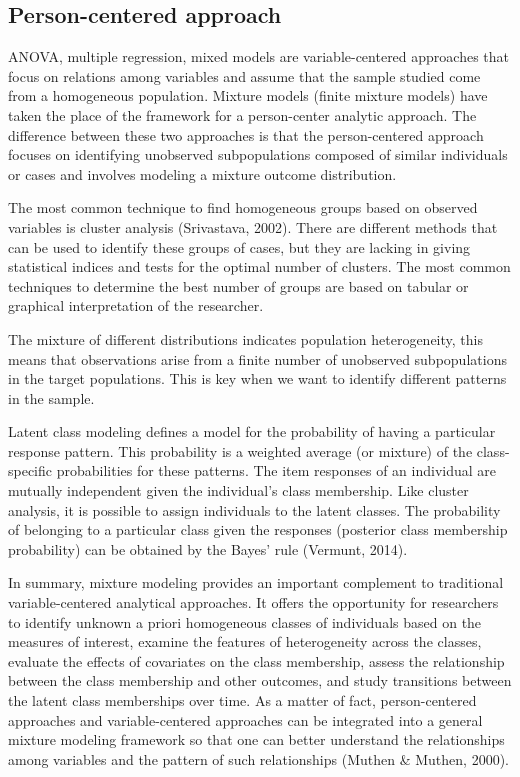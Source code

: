 \documentclass[12pt,a4paper,oneside]{reedthesis}
\begin{document}
\hypertarget{person-centered-approach}{%
\subsection{Person-centered approach}\label{person-centered-approach}}

ANOVA, multiple regression, mixed models are variable-centered approaches that focus on relations among variables and assume that the sample studied come from a homogeneous population. Mixture models (finite mixture models) have taken the place of the framework for a person-center analytic approach. The difference between these two approaches is that the person-centered approach focuses on identifying unobserved subpopulations composed of similar individuals or cases and involves modeling a mixture outcome distribution.

The most common technique to find homogeneous groups based on observed variables is cluster analysis (Srivastava, 2002). There are different methods that can be used to identify these groups of cases, but they are lacking in giving statistical indices and tests for the optimal number of clusters. The most common techniques to determine the best number of groups are based on tabular or graphical interpretation of the researcher.

The mixture of different distributions indicates population heterogeneity, this means that observations arise from a finite number of unobserved subpopulations in the target populations. This is key when we want to identify different patterns in the sample.

Latent class modeling defines a model for the probability of having a particular response pattern. This probability is a weighted average (or mixture) of the class-specific probabilities for these patterns. The item responses of an individual are mutually independent given the individual's class membership. Like cluster analysis, it is possible to assign individuals to the latent classes. The probability of belonging to a particular class given the responses (posterior class membership probability) can be obtained by the Bayes' rule (Vermunt, 2014).

In summary, mixture modeling provides an important complement to traditional variable-centered analytical approaches. It offers the opportunity for researchers to identify unknown a priori homogeneous classes of individuals based on the measures of interest, examine the features of heterogeneity across the classes, evaluate the effects of covariates on the class membership, assess the relationship between the class membership and other outcomes, and study transitions between the latent class memberships over time. As a matter of fact, person-centered approaches and variable-centered approaches can be integrated into a general mixture modeling framework so that one can better understand the relationships among variables and the pattern of such relationships (Muthen \& Muthen, 2000).
\end{document}

